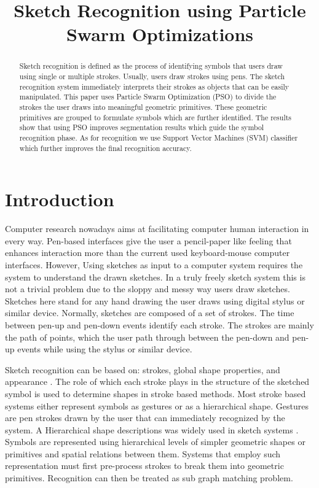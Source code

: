 \documentclass{article}
\title{Sketch Recognition using Particle Swarm Optimizations}
\begin{document}
\maketitle
\begin{abstract}
Sketch recognition is defined as the process of identifying symbols that users draw using single or multiple strokes. Usually, users draw strokes using pens. The sketch recognition system immediately interprets their strokes as objects that can be easily manipulated. This paper uses Particle Swarm Optimization (PSO) to divide the strokes the user draws into meaningful geometric primitives. These geometric primitives are grouped to formulate symbols which are further identified. The results show that using PSO improves segmentation results which guide the symbol recognition phase. As for recognition we use Support Vector Machines (SVM) classifier which further improves the final recognition accuracy.  
\end{abstract}

\section{Introduction}

Computer research nowadays aims at facilitating computer human interaction in every way. Pen-based interfaces give the user a pencil-paper like feeling that enhances interaction more than the current used keyboard-mouse computer interfaces. However, Using sketches as input to a computer system requires the system to understand the drawn sketches. In a truly freely sketch system this is not a trivial problem due to the sloppy and messy way users draw sketches. Sketches here stand for any hand drawing the user draws using digital stylus or similar device. Normally, sketches are composed of a set of strokes. The time between pen-up and pen-down events identify each stroke. The strokes are mainly the path of points, which the user path through between the pen-down and pen-up events while using the stylus or similar device. 

Sketch recognition can be based on: strokes, global shape properties, and appearance \cite{Oltmans07}. The role of which each stroke plays in the structure of the sketched symbol is used to determine shapes in stroke based methods. Most stroke based systems either represent symbols as gestures or as a  hierarchical shape. Gestures are pen strokes drawn by the user that can immediately recognized by the system. A Hierarchical shape descriptions was widely used in sketch systems \cite{HierarchicalParsing7,Ladder30,AlvaradoFreedom42,SketchRead2007}. Symbols are represented using hierarchical levels of simpler geometric shapes or primitives and spatial relations between them. Systems that employ such representation must first pre-process strokes to break them into geometric primitives. Recognition can then be treated as sub graph matching problem.   
\end{document}
